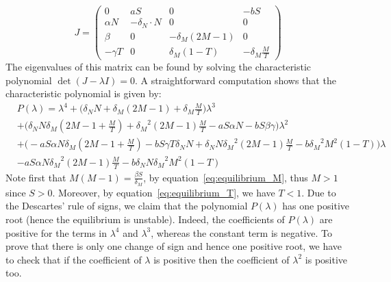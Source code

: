 \documentclass[a4paper, 12pt]{article}
\begin{document}
\[
J = \begin{pmatrix}
0 & aS & 0 & -bS \\
\alpha N &  - \delta_N \cdot N & 0 & 0 \\
\beta & 0 & -\delta_M (2M-1) & 0 \\
-\gamma T & 0 & \delta_M (1-T) & - \delta_M\frac{M}{T} 
\end{pmatrix}
\]
The eigenvalues of this matrix can be found by solving the characteristic polynomial $\det(J - \lambda I) = 0$. A straightforward computation shows that the characteristic polynomial is given by:
\begin{eqnarray*}
&P(\lambda) = \lambda^4 + \Big(\delta_N N + \delta_M (2M-1) + \delta_M \frac{M}{T}\Big) \lambda^3 \\
&+ \Big(\delta_N N \delta_M(2M-1 + \frac{M}{T}) + {\delta_M}^2 (2M-1)\frac{M}{T} -a S \alpha N - b S \beta \gamma \Big) \lambda^2 \\
&+ \Big(- a S \alpha N \delta_M (2M-1+\frac{M}{T})  - b S\gamma T\delta_N N + \delta_N N {\delta_M}^2(2M-1)\frac{M}{T}- b{\delta_M}^2 M^2(1-T)\Big) \lambda \\
&- a S \alpha N {\delta_M}^2 (2M-1) \frac{M}{T} - b \delta_N N {\delta_M}^2 M^2 (1-T)
\end{eqnarray*}
Note first that $M(M-1) = \frac{\beta S}{\delta_M}$, by equation~\eqref{eq:equilibrium_M}, thus  $M >1$ since $S > 0$. 
Moreover, by equation~\eqref{eq:equilibrium_T}, we have $T < 1$.
Due to the Descartes' rule of signs, we claim that the polynomial $P(\lambda)$ has one positive root (hence the equilibrium is unstable). Indeed, the coefficients of $P(\lambda)$ are positive for the terms in 
$\lambda^4$ and $\lambda^3$, whereas the constant term is negative. To prove that there is only one change of sign and hence one positive root, we have to check that if the coefficient of $\lambda$ is positive then the coefficient of 
$\lambda^2$ is positive too. 
\end{document}

